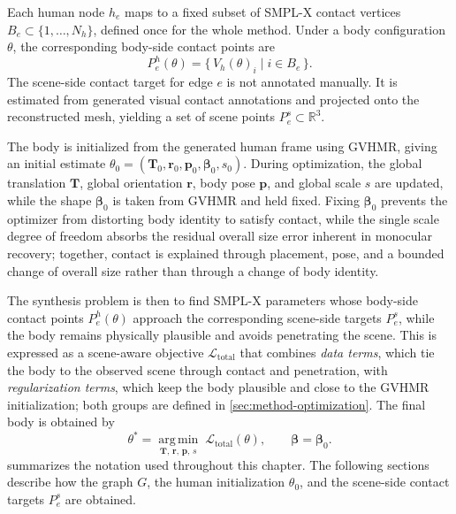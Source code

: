 Each human node $h_e$ maps to a fixed subset of SMPL-X contact vertices $B_e \subset \{1, \ldots, N_h\}$, defined once for the whole method. Under a body configuration $\theta$, the corresponding body-side contact points are
\begin{equation}
\label{eq:body-contact-points}
P_e^h(\theta) = \{\, V_h(\theta)_i \mid i \in B_e \,\}.
\end{equation}
The scene-side contact target for edge $e$ is not annotated manually. It is estimated from generated visual contact annotations and projected onto the reconstructed mesh, yielding a set of scene points $P_e^s \subset \mathbb{R}^{3}$.

The body is initialized from the generated human frame using GVHMR, giving an initial estimate $\theta_0 = (\mathbf{T}_0, \mathbf{r}_0, \mathbf{p}_0, \boldsymbol{\beta}_0, s_0)$. During optimization, the global translation $\mathbf{T}$, global orientation $\mathbf{r}$, body pose $\mathbf{p}$, and global scale $s$ are updated, while the shape $\boldsymbol{\beta}_0$ is taken from GVHMR and held fixed. Fixing $\boldsymbol{\beta}_0$ prevents the optimizer from distorting body identity to satisfy contact, while the single scale degree of freedom absorbs the residual overall size error inherent in monocular recovery; together, contact is explained through placement, pose, and a bounded change of overall size rather than through a change of body identity.

The synthesis problem is then to find SMPL-X parameters whose body-side contact points $P_e^h(\theta)$ approach the corresponding scene-side targets $P_e^s$, while the body remains physically plausible and avoids penetrating the scene. This is expressed as a scene-aware objective $\mathcal{L}_{\mathrm{total}}$ that combines \emph{data terms}, which tie the body to the observed scene through contact and penetration, with \emph{regularization terms}, which keep the body plausible and close to the GVHMR initialization; both groups are defined in \cref{sec:method-optimization}. The final body is obtained by
\begin{equation}
\label{eq:method-optimization-problem}
\theta^{\ast} = \operatorname*{arg\,min}_{\mathbf{T},\, \mathbf{r},\, \mathbf{p},\, s} \; \mathcal{L}_{\mathrm{total}}(\theta),
\qquad \boldsymbol{\beta} = \boldsymbol{\beta}_0.
\end{equation}
 summarizes the notation used throughout this chapter. The following sections describe how the graph $G$, the human initialization $\theta_0$, and the scene-side contact targets $P_e^s$ are obtained.

